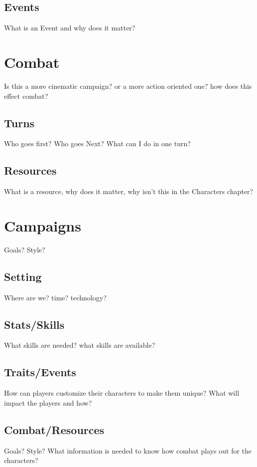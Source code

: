 \documentclass{article}
\begin{document}
\subsection{Events}
What is an Event and why does it matter?


\section{Combat}
Is this a more cinematic campaign? or a more action oriented one? how does this effect combat?

\subsection{Turns}
Who goes first? Who goes Next? What can I do in one turn?

\subsection{Resources}
What is a resource, why does it matter, why isn't this in the Characters chapter?


\section{Campaigns}
Goals? Style?

\subsection{Setting}
Where are we? time? technology?

\subsection{Stats/Skills}
What skills are needed? what skills are available?

\subsection{Traits/Events}
How can players customize their characters to make them unique? What will impact the players and how?

\subsection{Combat/Resources}
Goals? Style? What information is needed to know how combat plays out for the characters?
\end{document}
